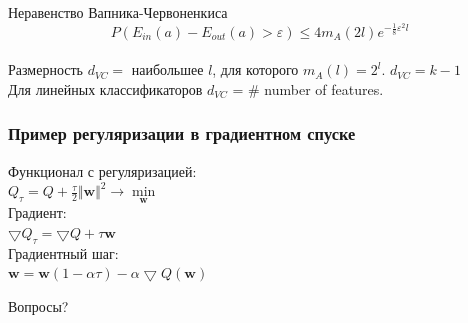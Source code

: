 \documentclass[10pt]{beamer}
\begin{document}

\begin{frame}{Неравенство Вапника-Червоненкиса}  
  $$P(E_{in}(a) - E_{out}(a) > \varepsilon) \leq 4 m_{A}(2l) e^{-\frac{1}{8}\varepsilon^2l}$$\\
  \bigbreak
  Размерность $d_{VC} = $ наибольшее $l$, для которого $m_{A}(l) = 2^l$. $d_{VC} = k-1$\\
  \bigbreak
  Для линейных классификаторов $d_{VC}$ = \# number of features.  
\end{frame}

\begin{frame}\frametitle{Пример регуляризации в градиентном спуске}
	Функционал с регуляризацией:\\
	$Q_{\tau} = Q + \frac{\tau}{2}\Vert \mathbf{w} \Vert^2 \rightarrow \min\limits_{\mathbf{w}}$\\
	\bigbreak
	Градиент:\\
	$\bigtriangledown Q_{\tau} = \bigtriangledown Q + \tau \mathbf{w}$\\
	\bigbreak
	Градиентный шаг:\\
	$\mathbf{w} = \mathbf{w}(1-\alpha \tau) - \alpha \bigtriangledown Q(\mathbf{w})$\\
\end{frame}

\begin{frame}[standout]
  Вопросы?
\end{frame}
\end{document}
